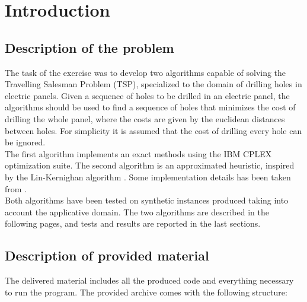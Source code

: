 
\section{Introduction}
\label{chap:introduction}

\subsection{Description of the problem}
The task of the exercise was to develop two algorithms capable of solving the Travelling Salesman Problem (TSP), specialized to the domain of drilling holes in electric panels. Given a sequence of holes to be drilled in an electric panel, the algorithms should be used to find a sequence of holes that minimizes the cost of drilling the whole panel, where the costs are given by the euclidean distances between holes. For simplicity it is assumed that the cost of drilling every hole can be ignored.\\ 
The first algorithm implements an exact methods using the IBM CPLEX optimization suite. The second algorithm is an approximated heuristic, inspired by the Lin-Kernighan algorithm \cite{LinK73}. Some implementation details has been taken from \cite{ImplemLK}. \\
Both algorithms have been tested on synthetic instances produced taking into account the applicative domain. The two algorithms are described in the following pages, and tests and results are reported in the last sections.

\subsection{Description of provided material}
The delivered material includes all the produced code and everything necessary to run the program.
The provided archive comes with the following structure:
\renewcommand*\DTstylecomment{\rmfamily\color{blue}\textit}

